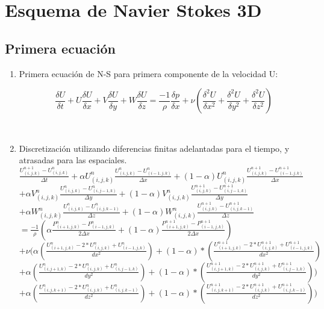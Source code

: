 \documentclass[a4paper]{article}
\begin{document}
\newpage
\section{Esquema de Navier Stokes 3D}
\subsection{Primera ecuación}

\begin{enumerate}

\item Primera ecuación de N-S para primera componente de la velocidad U:

$$ \frac{\delta U}{\delta t} + U \frac{\delta U}{\delta x} + V \frac{\delta U}{\delta y} + W \frac{\delta U}{\delta z} =  \frac{-1}{\rho} \frac{\delta p}{\delta x} + \nu (\frac{{\delta}^{2} U}{\delta {x}^{2}} + \frac{{\delta}^{2} U}{\delta {y}^{2}} + \frac{{\delta}^{2} U}{\delta {z}^{2}}) $$

~\\

\item Discretización utilizando diferencias finitas adelantadas para el tiempo, y atrasadas para las espaciales.
~\\
$ \frac{ {U}^{n+1}_{(i,j,k)} - U^{n}_{(i,j,k)}}{ \Delta t}  +  \alpha {U}^{n}_{(i,j,k)} \frac{ {U}^{n}_{(i,j,k)} - U^{n}_{(i-1,j,k)}}{ \Delta x} + (1 - \alpha) {U}^{n}_{(i,j,k)} \frac{ {U}^{n+1}_{(i,j,k)} - U^{n+1}_{(i-1,j,k)}}{ \Delta x}$ 
\\
$+ \alpha {V}^{n}_{(i,j,k)} \frac{ {U}^{n}_{(i,j,k)} - U^{n}_{(i,j-1,k)}}{ \Delta y} + (1 - \alpha) {V}^{n}_{(i,j,k)} \frac{ {U}^{n+1}_{(i,j,k)} - U^{n+1}_{(i,j-1,k)}}{ \Delta y}$
\\
$+ \alpha {W}^{n}_{(i,j,k)} \frac{ {U}^{n}_{(i,j,k)} - U^{n}_{(i,j,k-1)}}{ \Delta z} + (1 - \alpha) {W}^{n}_{(i,j,k)} \frac{ {U}^{n+1}_{(i,j,k)} - U^{n+1}_{(i,j,k-1)}}{ \Delta z}$
\\
$= \frac{-1}{\rho} ( \alpha \frac{P^{n}_{(i+1,j,k)} - P^{n}_{(i-1,j,k)} }{ 2 \Delta x } + (1 - \alpha) \frac{P^{n+1}_{(i+1,j,k)} - P^{n+1}_{(i-1,j,k)} }{ 2 \Delta x })  $
\\
$+ \nu (\alpha (\frac{ U^{n}_{(i+1,j,k)} - 2*U^{n}_{(i,j,k)} + U^{n}_{(i-1,j,k)}}{dx^2}) + (1-\alpha)*(\frac{ U^{n+1}_{(i+1,j,k)} - 2*U^{n+1}_{(i,j,k)} + U^{n+1}_{(i-1,j,k)}}{dx^2})$
\\
$+ \alpha (\frac{ U^{n}_{(i,j+1,k)} - 2*U^{n}_{(i,j,k)} + U^{n}_{(i,j-1,k)}}{dy^2}) + (1-\alpha)*(\frac{ U^{n+1}_{(i,j+1,k)} - 2*U^{n+1}_{(i,j,k)} + U^{n+1}_{(i,j-1,k)}}{dy^2}))$
\\
$+ \alpha (\frac{ U^{n}_{(i,j,k+1)} - 2*U^{n}_{(i,j,k)} + U^{n}_{(i,j,k-1)}}{dz^2}) + (1-\alpha)*(\frac{ U^{n+1}_{(i,j,k+1)} - 2*U^{n+1}_{(i,j,k)} + U^{n+1}_{(i,j,k-1)}}{dz^2}))$
~\\


\end{enumerate}
\end{document}
